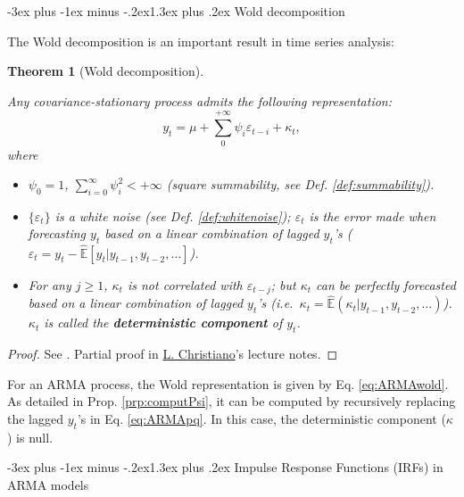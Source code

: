 \documentclass[
  11pt,
]{book}
\makeatletter
\providecommand{\tightlist}{%
  \setlength{\itemsep}{0pt}\setlength{\parskip}{0pt}}
\renewcommand\section{\@startsection{section}{1}{\z@}
  {-3ex plus -1ex minus -.2ex}{1.3ex plus .2ex}
  {\normalfont\Large\bfseries\color{TextbookInk}}}
\newtheorem{theorem}{Theorem}[chapter]
\theoremstyle{definition}
\theoremstyle{definition}
\theoremstyle{definition}
\theoremstyle{definition}
\theoremstyle{remark}
\makeatother
\begin{document}
\section{Wold decomposition}\label{wold-decomposition}

The Wold decomposition is an important result in time series analysis:

\begin{theorem}[Wold decomposition]
\protect\hypertarget{thm:Wold}{}\label{thm:Wold}

Any covariance-stationary process admits the following representation:
\[
y_t = \mu + \sum_{0}^{+\infty} \psi_i \varepsilon_{t-i} + \kappa_t,
\]
where

\begin{itemize}
\tightlist
\item
  \(\psi_0 = 1\), \(\sum_{i=0}^{\infty} \psi_i^2 < +\infty\) (square summability, see Def. \ref{def:summability}).
\item
  \(\{\varepsilon_t\}\) is a white noise (see Def. \ref{def:whitenoise}); \(\varepsilon_t\) is the error made when forecasting \(y_t\) based on a linear combination of lagged \(y_t\)'s (\(\varepsilon_t = y_t - \hat{\mathbb{E}}[y_t|y_{t-1},y_{t-2},\dots]\)).
\item
  For any \(j \ge 1\), \(\kappa_t\) is not correlated with \(\varepsilon_{t-j}\); but \(\kappa_t\) can be perfectly forecasted based on a linear combination of lagged \(y_t\)'s (i.e.~\(\kappa_t = \hat{\mathbb{E}}(\kappa_t|y_{t-1},y_{t-2},\dots)\)). \(\kappa_t\) is called the \textbf{deterministic component} of \(y_t\).
\end{itemize}

\end{theorem}

\begin{proof}
See \citet{Anderson_1971}. Partial proof in \href{http://faculty.wcas.northwestern.edu/~lchrist/finc520/wold.pdf}{L. Christiano}'s lecture notes.
\end{proof}

For an ARMA process, the Wold representation is given by Eq. \eqref{eq:ARMAwold}. As detailed in Prop. \ref{prp:computPsi}, it can be computed by recursively replacing the lagged \(y_t\)'s in Eq. \eqref{eq:ARMApq}. In this case, the deterministic component (\(\kappa\)) is null.

\section{Impulse Response Functions (IRFs) in ARMA models}\label{IRFARMA}
\end{document}
